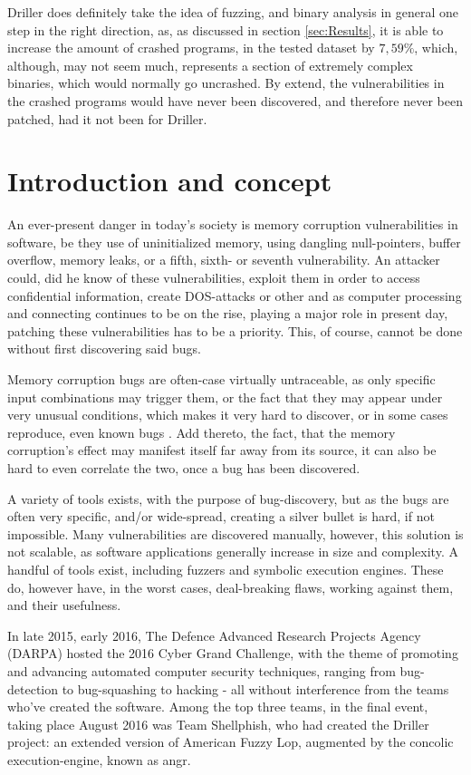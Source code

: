 \documentclass[a4paper]{article}
\begin{document}
Driller does definitely take the idea of fuzzing, and binary analysis in general one step in the right direction, as, as discussed in section \ref{sec:Results}, it is able to increase the amount of crashed programs, in the tested dataset by $7,59 \%$, which, although, may not seem much, represents a section of extremely complex binaries, which would normally go uncrashed. By extend, the vulnerabilities in the crashed programs would have never been discovered, and therefore never been patched, had it not been for Driller.
\newpage
\section{Introduction and concept}
\label{sec:Intro}
An ever-present danger in today's society is memory corruption vulnerabilities in software, be they use of uninitialized memory, using dangling null-pointers, buffer overflow, memory leaks, or a fifth, sixth- or seventh vulnerability. An attacker could, did he know of these vulnerabilities, exploit them in order to access confidential information, create DOS-attacks or other and as computer processing and connecting continues to be on the rise, playing a major role in present day, patching these vulnerabilities has to be a priority. This, of course, cannot be done without first discovering said bugs. 

Memory corruption bugs are often-case virtually untraceable, as only specific input combinations may trigger them, or the fact that they may appear under very unusual conditions, which makes it very hard to discover, or in some cases reproduce, even known bugs . Add thereto, the fact, that the memory corruption's effect may manifest itself far away from its source, it can also be hard to even correlate the two, once a bug has been discovered.

A variety of tools exists, with the purpose of bug-discovery, but as the bugs are often very specific, and/or wide-spread, creating a silver bullet is hard, if not impossible. Many vulnerabilities are discovered manually, however, this solution is not scalable, as software applications generally increase in size and complexity. A handful of tools exist, including fuzzers and symbolic execution engines. These do, however have, in the worst cases, deal-breaking flaws, working against them, and their usefulness.

In late 2015, early 2016, The Defence Advanced Research Projects Agency (DARPA) hosted the 2016 Cyber Grand Challenge, with the theme of promoting and advancing automated computer security techniques, ranging from bug-detection to bug-squashing to hacking - all without interference from the teams who've created the software. Among the top three teams, in the final event, taking place August 2016 was Team Shellphish, who had created the Driller project: an extended version of American Fuzzy Lop, augmented by the concolic execution-engine, known as angr.
\end{document}

